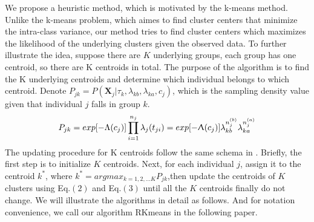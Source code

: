 \documentclass[12pt]{article}
\begin{document}
We propose a heuristic method, which is motivated by the k-means method. Unlike the k-means problem, which aimes to find cluster centers that minimize the intra-class variance, our method tries to find cluster centers which maximizes the likelihood of the underlying clusters given the observed data. To further illustrate the idea, suppose there are $K$ underlying groups, each group has one centroid, so there are K centroids in total. The purpose of the algorithm is to find the K underlying centroids and determine which individual belongs to which centroid. Denote $P_{jk}=P(\pmb X_j|\tau_k,\lambda_{kb},\lambda_{ka},c_j)$, which is the sampling density value given that individual $j$ falls in group $k$.
\begin{equation}\label{eqn:Pjk}
P_{jk}=exp[-\Lambda(c_j)]\prod_{i=1}^{n_j}\lambda_j(t_{ji})=exp[-\Uplambda(c_j)]\lambda_{kb}^{n_j^{(b)}}\lambda_{ka}^{n_j^{(a)}}
\end{equation}
The updating procedure for K centroids follow the same schema in \cite{hartigan1979algorithm}. Briefly, the first step is to initialize $K$ centroids. Next, for each individual $j$, assign it to the centroid $k^*$, where $k^*=argmax_{k=1,2,...K} P_{jk}$,then update the centroids of $K$ clusters using Eq.$(2)$ and Eq.$(3)$ until all the $K$ centroids finally do not change. We will illustrate the algorithms in detail as follows. And for notation convenience, we call our algorithm RKmeans in the following paper.
\end{document}
